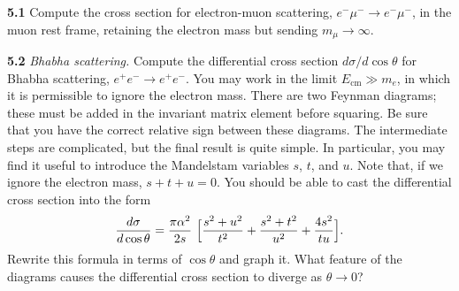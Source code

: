 \problems

\textbf{5.1} Compute the cross section for electron-muon scattering,
$e^{-}\mu^{-}\to e^{-}\mu^{-}$, in the muon rest frame, retaining the electron
mass but sending $m_\mu\to\infty$.

\textbf{5.2} \emph{Bhabha scattering.}  Compute the differential cross section
$d\sigma/d\cos\theta$ for Bhabha scattering, $e^{+}e^{-}\to e^{+}e^{-}$.  You
may work in the limit $E_{\mathrm{cm}} \gg m_e$, in which it is permissible to
ignore the electron mass.  There are two Feynman diagrams; these must be added
in the invariant matrix element before squaring.  Be sure that you have the
correct relative sign between these diagrams.  The intermediate steps are
complicated, but the final result is quite simple.  In particular, you may
find it useful to introduce the Mandelstam variables $s$, $t$, and $u$.  Note
that, if we ignore the electron mass, $s+t+u = 0$.  You should be able to cast
the differential cross section into the form
\begin{equation}
  \frac{d\sigma}{d\cos\theta} = \frac{\pi\alpha^2}{2s}\ \Bigl[ \frac{s^2+u^2}
    {t^2} + \frac{s^2+t^2}{u^2} + \frac{4s^2}{tu} \Bigr] .
\end{equation}
Rewrite this formula in terms of $\cos\theta$ and graph it.  What feature of
the diagrams causes the differential cross section to diverge as $\theta\to 0$?

